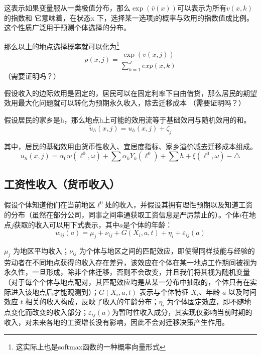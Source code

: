 \documentclass[a4paper,12pt]{article}
\begin{document}
这表示如果变量服从一类极值分布，那么$\exp\left(\bar{v}(x)\right)$可以表示为所有$v(x, k)$的指数和
它意味着，在状态x 下，选择某一选项j的概率与效用的指数值成比例。
这个性质广泛用于预测个体选择的分布。

那么以上的地点选择概率就可以化为\footnote{这实际上也是softmax函数的一种概率向量形式}
\begin{equation}
  \rho(x,j)=\frac{\exp(v(x,j))}{\sum\limits_{k=1}^{J} exp(x,k)}
\end{equation}
（需要证明吗？）


假设收入的边际效用是固定的，居民可以在固定利率下自由借贷，那么居民的期望效用最大化问题就可以转化为预期永久收入，除去迁移成本
（需要证明吗？）

假设居民的家乡是h，那么地点h上可能的效用流等于基础效用与随机效用的和。
\begin{equation}
  \tilde u_{h}(x,j)=u_{h}(x,j) +\zeta_j
\end{equation}

其中，居民的基础效用由货币性收入、宜居度指标、家乡溢价减去迁移成本组成。
\begin{equation}
  u_h(x,j)=\alpha_0 w(\ell^0,\omega)+\sum\limits \alpha_{k}Y_{k}(\ell^{0})+\sum\limits h +\xi(\ell^{0},\omega)-\triangle
\end{equation}

\subsection{工资性收入（货币收入）}
假设个体知道他们在当前地区$\ell^0$处的收入，并假设其拥有理性预期以及知道工资的分布（虽然在部分公司，同事之间串通获取工资信息是严厉禁止的）。个体$i$在地点$j$获取的收入可以用下式表示，其中$a$是个体的年龄：
\begin{equation}
  w_{ij}(a)=\mu_j+\nu_{ij}+G(X_i,a,t)+\eta_i+\varepsilon_{ij}(a)
\end{equation}

$\mu_j$ 为地区平均收入；$\nu_{ij}$ 为个体与地区之间的匹配效应，即使得同样技能与经验的劳动者在不同地点获得的收入存在差异，该效应在个体在某一地点工作期间被视为永久性，一旦形成，除非个体迁移，否则不会改变，并且我们将其视为随机变量（对于每个个体与地点配对，其匹配效应均是从某一分布中抽取的，个体只有在实际进入该地点后才能观测到）；$G(X_i,a,t)$ 表示与个体特征 $X_i$、年龄 $a$ 以及时间效应 $t$ 相关的收入构成，反映了收入的年龄分布；$\eta_i$ 为个体固定效应，即不随地点变化而改变的收入部分；$\varepsilon_{ij}(a)$为暂时性收入成分，其实现仅影响当前时期的收入，对未来各地的工资增长没有影响，因此不会对迁移决策产生作用。
\end{document}
